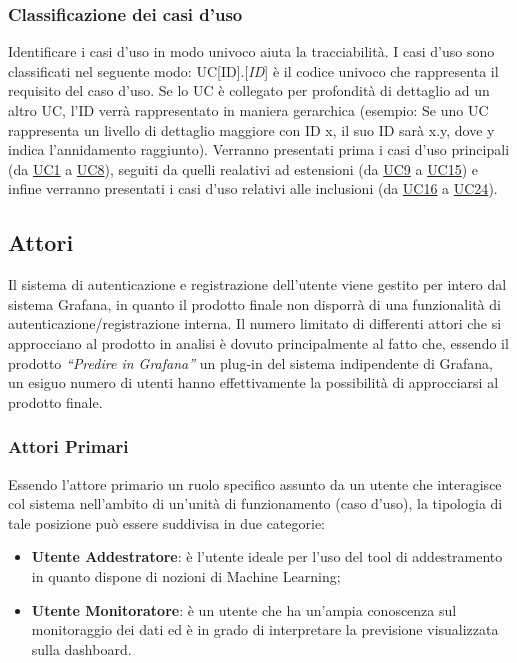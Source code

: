 		\subsubsection{Classificazione dei casi d'uso}
Identificare i casi d’uso in modo univoco aiuta la tracciabilità.  I casi d’uso sono classificati nel seguente modo:  UC[ID].[\emph{ID}] è il codice univoco che rappresenta il requisito del caso d’uso. Se lo UC è collegato per profondità di dettaglio ad un altro UC, l’ID verrà rappresentato in maniera gerarchica (esempio: Se uno UC rappresenta un livello di dettaglio maggiore con ID x, il suo ID sarà x.y, dove y indica l’annidamento raggiunto). Verranno presentati prima i casi d'uso principali (da \hyperref[par:UC1]{UC1} a \hyperref[par:UC8]{UC8}), seguiti da quelli realativi ad estensioni (da \hyperref[par:UC9]{UC9} a \hyperref[par:UC15]{UC15}) e infine verranno presentati i casi d'uso relativi alle inclusioni (da \hyperref[par:UC16]{UC16} a \hyperref[par:UC24]{UC24}).

	\subsection{Attori}
Il sistema di autenticazione e registrazione dell’utente viene gestito per intero dal sistema Grafana, in quanto il prodotto finale non disporrà di una funzionalità di autenticazione/registrazione interna.
Il numero limitato di differenti  attori che si approcciano al prodotto in analisi è dovuto principalmente  al fatto che, essendo il prodotto \emph{“Predire in Grafana”} un plug-in del sistema indipendente di Grafana, un esiguo numero di utenti hanno effettivamente la possibilità di approcciarsi al prodotto finale.

	\subsubsection{Attori Primari}
Essendo l’attore primario un ruolo specifico assunto da un utente che interagisce col sistema nell’ambito di un’unità di funzionamento (caso d’uso), la tipologia di tale posizione può essere suddivisa in due categorie:
	\begin{itemize}
		\item\textbf{Utente Addestratore}:  è l’utente ideale per l’uso del tool di addestramento in quanto dispone di nozioni di Machine Learning\glo;
		\item\textbf{Utente Monitoratore}: è un utente che ha un’ampia conoscenza sul monitoraggio dei dati ed è in grado di interpretare la previsione visualizzata sulla dashboard.
		
 	\end{itemize}


